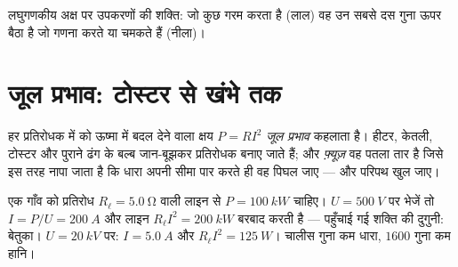 \begin{omfigure}

{\small लघुगणकीय अक्ष पर उपकरणों की शक्ति: जो कुछ गरम करता है (लाल)
वह उन सबसे दस गुना ऊपर बैठा है जो गणना करते या चमकते हैं (नीला)।}
\end{omfigure}

\section{जूल प्रभाव: टोस्टर से खंभे तक}

\begin{definition}[जूल प्रभाव]\label{def:g11:circuits-and-power:joule}
हर प्रतिरोधक में  को ऊष्मा में बदल देने वाला क्षय
$P = RI^2$ \emph{जूल प्रभाव} कहलाता है। हीटर, केतली, टोस्टर और
पुराने ढंग के बल्ब जान-बूझकर प्रतिरोधक बनाए जाते हैं; और \emph{फ़्यूज़}
वह पतला तार है जिसे इस तरह नापा जाता है कि धारा अपनी सीमा पार करते
ही वह पिघल जाए --- और परिपथ खुल जाए।
\end{definition}

\begin{example}[खंभे ऊँचे विभव पर क्यों चलते हैं]\label{ex:g11:circuits-and-power:transmission}
एक गाँव को प्रतिरोध $R_\ell = \qty{5.0}{\ohm}$ वाली लाइन से $P = \qty{100}{kW}$ चाहिए। $U = \qty{500}{V}$ पर
भेजें तो $I = P/U =
\qty{200}{A}$ और लाइन $R_\ell I^2 = \qty{200}{kW}$ बरबाद करती है --- पहुँचाई गई शक्ति की दुगुनी:
बेतुका। $U = \qty{20}{kV}$ पर: $I = \qty{5.0}{A}$ और $R_\ell I^2 = \qty{125}{W}$। चालीस गुना कम धारा, $1600$ गुना कम
हानि।
\end{example}

